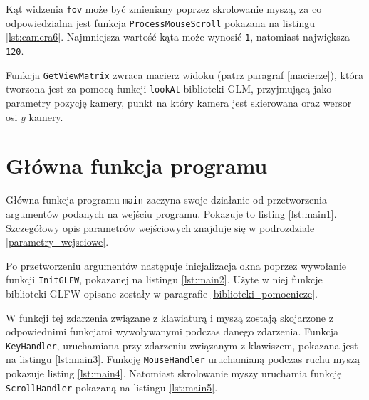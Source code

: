 \documentclass[12pt, twoside, openany]{report}
\begin{document}


Kąt widzenia \texttt{fov} może być zmieniany poprzez skrolowanie myszą, za co odpowiedzialna jest funkcja \texttt{ProcessMouseScroll} pokazana na listingu \ref{lst:camera6}. Najmniejsza wartość kąta może wynosić \texttt 1, natomiast największa \texttt{120}.



Funkcja \texttt{GetViewMatrix} zwraca macierz widoku (patrz paragraf \ref{macierze}), która tworzona jest za pomocą funkcji \texttt{lookAt} biblioteki GLM, przyjmującą jako parametry pozycję kamery, punkt na który kamera jest skierowana oraz wersor osi $y$ kamery.




\section{Główna funkcja programu}
\label{funkcja_glowna}

Główna funkcja programu \texttt{main} zaczyna swoje działanie od przetworzenia argumentów podanych na wejściu programu. Pokazuje to listing \ref{lst:main1}. Szczegółowy opis parametrów wejściowych znajduje się w podrozdziale \ref{parametry_wejsciowe}.



Po przetworzeniu argumentów następuje inicjalizacja okna poprzez wywołanie funkcji \texttt{InitGLFW}, pokazanej na listingu \ref{lst:main2}. Użyte w niej funkcje biblioteki GLFW opisane zostały w paragrafie \ref{biblioteki_pomocnicze}.



W funkcji tej zdarzenia związane z klawiaturą i myszą zostają skojarzone z odpowiednimi funkcjami wywoływanymi podczas danego zdarzenia. Funkcja\\\texttt{KeyHandler}, uruchamiana przy zdarzeniu związanym z klawiszem, pokazana jest na listingu \ref{lst:main3}.  Funkcję \texttt{MouseHandler} uruchamianą podczas ruchu myszą pokazuje listing \ref{lst:main4}. Natomiast skrolowanie myszy uruchamia funkcję \texttt{ScrollHandler} pokazaną na listingu \ref{lst:main5}.
\end{document}
